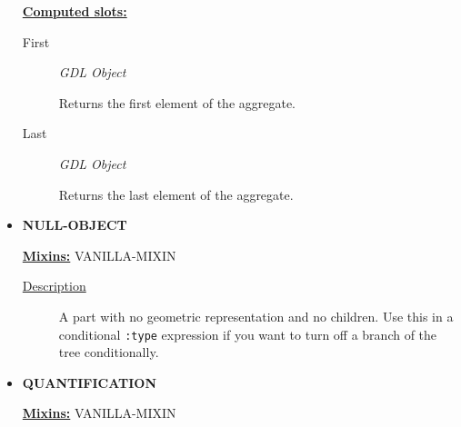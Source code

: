 \documentclass [11pt]{book}
\begin{document}
\begin{itemize}
\begin{description}
\end{description}








\textbf{
\underline{Computed slots:}}

\begin{description}

\item [First]
\emph{GDL Object}

 Returns the first element of the aggregate.




\item [Last]
\emph{GDL Object}

 Returns the last element of the aggregate.




\end{description}







\item {}
\label{prim:null-object}
\textbf{NULL-OBJECT}


\textbf{
\underline{Mixins:}} VANILLA-MIXIN





\begin{description}

\item [
\underline{Description}]


A part with no geometric representation and no children. Use this in a 
conditional \texttt{:type} expression if you want to turn off a branch of the tree conditionally.



\end{description}









\item {}
\label{prim:quantification}
\textbf{QUANTIFICATION}


\textbf{
\underline{Mixins:}} VANILLA-MIXIN





\begin{description}


\end{description}
\end{itemize}
\end{document}
